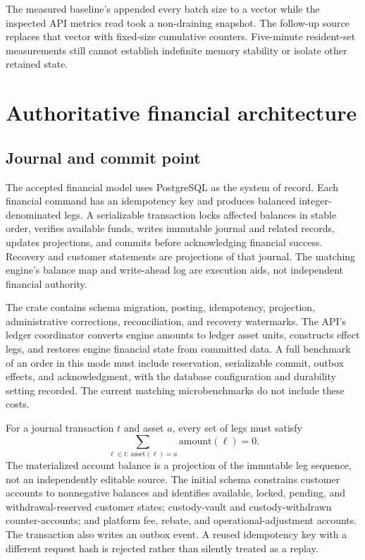 \documentclass[envcountsame,runningheads,notitlepage]{llncs}
\newcommand{\pathref}[1]{\texttt{\detokenize{#1}}}
\begin{document}
The measured baseline's \pathref{BatchMetrics::record_batch} appended every batch size to a vector while the inspected API metrics read took a non-draining snapshot. The follow-up source replaces that vector with fixed-size cumulative counters. Five-minute resident-set measurements still cannot establish indefinite memory stability or isolate other retained state.\cite{source}

\section{Authoritative financial architecture}
\subsection{Journal and commit point}
The accepted financial model uses PostgreSQL as the system of record. Each financial command has an idempotency key and produces balanced integer-denominated legs. A serializable transaction locks affected balances in stable order, verifies available funds, writes immutable journal and related records, updates projections, and commits before acknowledging financial success. Recovery and customer statements are projections of that journal. The matching engine's balance map and write-ahead log are execution aids, not independent financial authority.\cite{adrs}

The \pathref{ledger} crate contains schema migration, posting, idempotency, projection, administrative corrections, reconciliation, and recovery watermarks. The API's ledger coordinator converts engine amounts to ledger asset units, constructs effect legs, and restores engine financial state from committed data. A full benchmark of an order in this mode must include reservation, serializable commit, outbox effects, and acknowledgment, with the database configuration and durability setting recorded. The current matching microbenchmarks do not include these costs.

For a journal transaction $t$ and asset $a$, every set of legs must satisfy
\begin{equation}
\sum_{\ell\in t:\,\mathrm{asset}(\ell)=a}\mathrm{amount}(\ell)=0.
\end{equation}
The materialized account balance is a projection of the immutable leg sequence, not an independently editable source. The initial schema constrains customer accounts to nonnegative balances and identifies available, locked, pending, and withdrawal-reserved customer states; custody-vault and custody-withdrawn counter-accounts; and platform fee, rebate, and operational-adjustment accounts. The transaction also writes an outbox event. A reused idempotency key with a different request hash is rejected rather than silently treated as a replay.\cite{source}
\end{document}
